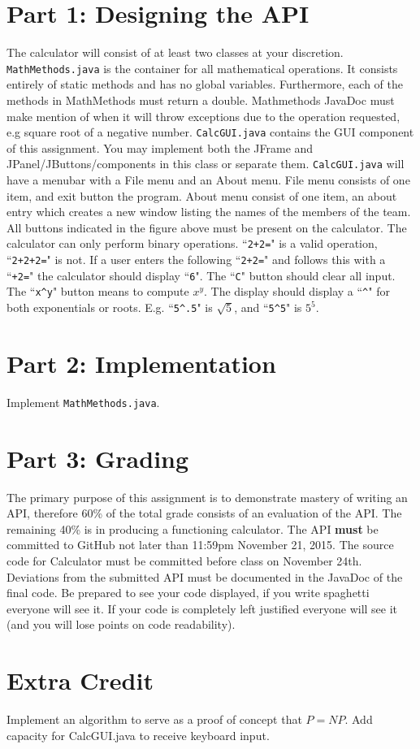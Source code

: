 \documentclass[]{simple}
\begin{document}
\section{Part 1: Designing the API}
The calculator will consist of at least two classes at your discretion.
\verb|MathMethods.java| is the container for all mathematical operations.
It consists entirely of static methods and has no global variables.
Furthermore, each of the methods in MathMethods must return a double.
Mathmethods JavaDoc must make mention of when it will throw exceptions due to the operation requested, e.g square root of a negative number.
\verb|CalcGUI.java| contains the GUI component of this assignment.
You may implement both the JFrame and JPanel/JButtons/components in this class or separate them.
\verb|CalcGUI.java| will have a menubar with a File menu and an About menu.
File menu consists of one item, and exit button the program.
About menu consist of one item, an about entry which creates a new window listing the names of the members of the team.
All buttons indicated in the figure above must be present on the calculator.
The calculator can only perform binary operations. ``\verb|2+2=|" is a valid operation, ``\verb|2+2+2=|" is not. 
If a user enters the following ``\verb|2+2=|" and follows this with a ``\verb|+2=|" the calculator should display ``\verb|6|".
The ``\verb|C|" button should clear all input.
The ``\verb|x^y|" button means to compute $x^y$.
The display should display a ``\verb|^|" for both exponentials or roots.
E.g. ``\verb|5^.5|" is $\sqrt{5}$, and ``\verb|5^5|" is $5^{5}$.

\section{Part 2: Implementation}
Implement \verb|MathMethods.java|.

\section {Part 3: Grading}
The primary purpose of this assignment is to demonstrate mastery of writing an API, therefore 60\% of the total grade consists of an evaluation of the API.
The remaining 40\% is in producing a functioning calculator.
The API \textbf{must} be committed to GitHub not later than 11:59pm November 21, 2015.
The source code for Calculator must be committed before class on November 24th.
Deviations from the submitted API must be documented in the JavaDoc of the final code.
Be prepared to see your code displayed, if you write spaghetti everyone will see it.
If your code is completely left justified everyone will see it (and you will lose points on code readability).

\section{Extra Credit}
Implement an algorithm to serve as a proof of concept that $P=NP$.
Add capacity for CalcGUI.java to receive keyboard input.
\end{document}
